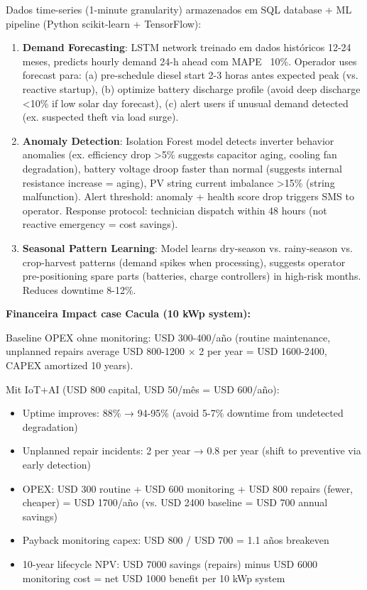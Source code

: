 \documentclass[12pt, a4paper]{article}
\begin{document}
Dados time-series (1-minute granularity) armazenados em SQL database + ML pipeline (Python scikit-learn + TensorFlow):
\begin{enumerate}
\item\textbf{Demand Forecasting}: LSTM network treinado em dados históricos 12-24 meses, predicts hourly demand 24-h ahead com MAPE ~10\%. Operador uses forecast para: (a) pre-schedule diesel start 2-3 horas antes expected peak (vs. reactive startup), (b) optimize battery discharge profile (avoid deep discharge <10\% if low solar day forecast), (c) alert users if unusual demand detected (ex. suspected theft via load surge).

\item\textbf{Anomaly Detection}: Isolation Forest model detects inverter behavior anomalies (ex. efficiency drop >5\% suggests capacitor aging, cooling fan degradation), battery voltage droop faster than normal (suggests internal resistance increase = aging), PV string current imbalance >15\% (string malfunction). Alert threshold: anomaly + health score drop triggers SMS to operator. Response protocol: technician dispatch within 48 hours (not reactive emergency = cost savings).

\item\textbf{Seasonal Pattern Learning}: Model learns dry-season vs. rainy-season vs. crop-harvest patterns (demand spikes when processing), suggests operator pre-positioning spare parts (batteries, charge controllers) in high-risk months. Reduces downtime 8-12\%.
\end{enumerate}\textbf{Financeira Impact case Cacula (10 kWp system):}

Baseline OPEX ohne monitoring: USD 300-400/año (routine maintenance, unplanned repairs average USD 800-1200 × 2 per year = USD 1600-2400, CAPEX amortized 10 years). 

Mit IoT+AI (USD 800 capital, USD 50/mês = USD 600/año):
\begin{itemize}
\item Uptime improves: 88\% → 94-95\% (avoid 5-7\% downtime from undetected degradation)
\item Unplanned repair incidents: 2 per year → 0.8 per year (shift to preventive via early detection)
\item OPEX: USD 300 routine + USD 600 monitoring + USD 800 repairs (fewer, cheaper) = USD 1700/año (vs. USD 2400 baseline = USD 700 annual savings)
\item Payback monitoring capex: USD 800 / USD 700 = 1.1 años breakeven
\item 10-year lifecycle NPV: USD 7000 savings (repairs) minus USD 6000 monitoring cost = net USD 1000 benefit per 10 kWp system
\end{itemize}
\end{document}
